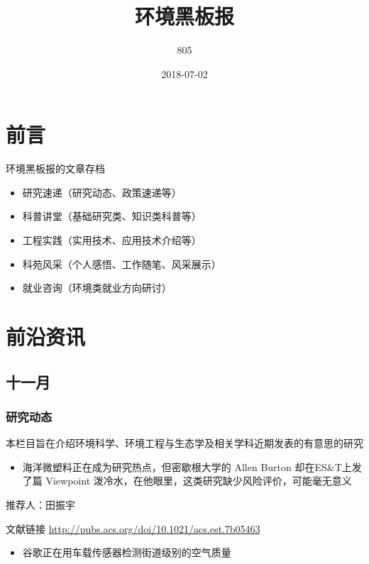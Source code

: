 \documentclass[]{book}
\title{环境黑板报}
\author{805}
\date{2018-07-02}
\providecommand{\tightlist}{%
  \setlength{\itemsep}{0pt}\setlength{\parskip}{0pt}}
\begin{document}
\maketitle

{
\setcounter{tocdepth}{1}
\tableofcontents
}
\chapter{前言}

环境黑板报的文章存档

\begin{itemize}
\item
  研究速递（研究动态、政策速递等）
\item
  科普讲堂（基础研究类、知识类科普等）
\item
  工程实践（实用技术、应用技术介绍等）
\item
  科苑风采（个人感悟、工作随笔、风采展示）
\item
  就业咨询（环境类就业方向研讨）
\end{itemize}

\chapter{前沿资讯}

\section*{十一月}

\subsection*{研究动态}

本栏目旨在介绍环境科学、环境工程与生态学及相关学科近期发表的有意思的研究

\begin{itemize}
\tightlist
\item
  海洋微塑料正在成为研究热点，但密歇根大学的 Allen Burton
  却在ES\&T上发了篇 Viewpoint
  泼冷水，在他眼里，这类研究缺少风险评价，可能毫无意义
\end{itemize}

推荐人：田振宇

文献链接 \url{http://pubs.acs.org/doi/10.1021/acs.est.7b05463}

\begin{itemize}
\tightlist
\item
  谷歌正在用车载传感器检测街道级别的空气质量
\end{itemize}
\end{document}
